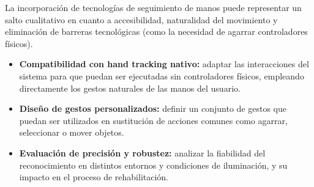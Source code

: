 La incorporación de tecnologías de seguimiento de manos puede representar un salto cualitativo en cuanto a accesibilidad, naturalidad del movimiento y eliminación de barreras tecnológicas (como la necesidad de agarrar controladores físicos).

\begin{itemize}
    \item \textbf{Compatibilidad con hand tracking nativo:} adaptar las interacciones del sistema para que puedan ser ejecutadas sin controladores físicos, empleando directamente los gestos naturales de las manos del usuario.
    \item \textbf{Diseño de gestos personalizados:} definir un conjunto de gestos que puedan ser utilizados en sustitución de acciones comunes como agarrar, seleccionar o mover objetos.
    \item \textbf{Evaluación de precisión y robustez:} analizar la fiabilidad del reconocimiento en distintos entornos y condiciones de iluminación, y su impacto en el proceso de rehabilitación.
\end{itemize}